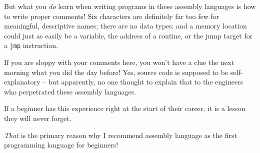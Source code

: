 But what you \textit{do} learn when writing programs in these assembly languages is how to write proper comments! Six characters are definitely far too few for meaningful, descriptive names; there are no data types; and a memory location could just as easily be a variable, the address of a routine, or the jump target for a \lstinline|jmp| instruction.

If you are sloppy with your comments here, you won't have a clue the next morning what you did the day before! Yes, source code is supposed to be self-explanatory – but apparently, no one thought to explain that to the engineers who perpetrated these assembly languages.

If a beginner has this experience right at the start of their career, it is a lesson they will never forget.

\textit{That} is the primary reason why I recommend assembly language as the first programming language for beginners!













